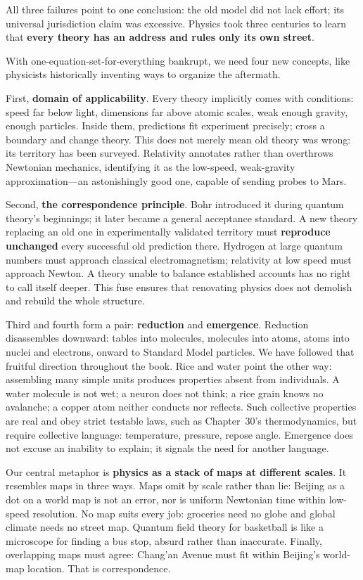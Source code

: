 All three failures point to one conclusion: the old model did not lack effort; its universal jurisdiction claim was excessive. Physics took three centuries to learn that \textbf{every theory has an address and rules only its own street}.


With one-equation-set-for-everything bankrupt, we need four new concepts, like physicists historically inventing ways to organize the aftermath.

First, \textbf{domain of applicability}. Every theory implicitly comes with conditions: speed far below light, dimensions far above atomic scales, weak enough gravity, enough particles. Inside them, predictions fit experiment precisely; cross a boundary and change theory. This does not merely mean old theory was wrong: its territory has been surveyed. Relativity annotates rather than overthrows Newtonian mechanics, identifying it as the low-speed, weak-gravity approximation---an astonishingly good one, capable of sending probes to Mars.

Second, \textbf{the correspondence principle}. Bohr introduced it during quantum theory's beginnings; it later became a general acceptance standard. A new theory replacing an old one in experimentally validated territory must \textbf{reproduce unchanged} every successful old prediction there. Hydrogen at large quantum numbers must approach classical electromagnetism; relativity at low speed must approach Newton. A theory unable to balance established accounts has no right to call itself deeper. This fuse ensures that renovating physics does not demolish and rebuild the whole structure.

Third and fourth form a pair: \textbf{reduction} and \textbf{emergence}. Reduction disassembles downward: tables into molecules, molecules into atoms, atoms into nuclei and electrons, onward to Standard Model particles. We have followed that fruitful direction throughout the book. Rice and water point the other way: assembling many simple units produces properties absent from individuals. A water molecule is not wet; a neuron does not think; a rice grain knows no avalanche; a copper atom neither conducts nor reflects. Such collective properties are real and obey strict testable laws, such as Chapter~30's thermodynamics, but require collective language: temperature, pressure, repose angle. Emergence does not excuse an inability to explain; it signals the need for another language.

Our central metaphor is \textbf{physics as a stack of maps at different scales}. It resembles maps in three ways. Maps omit by scale rather than lie: Beijing as a dot on a world map is not an error, nor is uniform Newtonian time within low-speed resolution. No map suits every job: groceries need no globe and global climate needs no street map. Quantum field theory for basketball is like a microscope for finding a bus stop, absurd rather than inaccurate. Finally, overlapping maps must agree: Chang'an Avenue must fit within Beijing's world-map location. That is correspondence.


